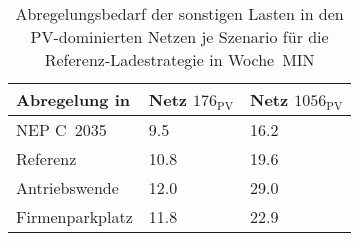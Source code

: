 {
\renewcommand{\arraystretch}{1.2}%
\begin{table}[H]
	\begin{center}
		\caption{Abregelungsbedarf der sonstigen Lasten in den PV-dominierten Netzen je Szenario für die Referenz-Ladestrategie in Woche~MIN}
		\begin{tabu} to 0.6\textwidth {X[1.5] X[1, r] X[1, r]}
			\toprule
			Abregelung in   \si{\mwh}    & Netz \(176_{\text{PV}}\) & Netz \(1056_{\text{PV}}\) \\ \midrule
			NEP C~\num{2035}             & \num{9.5}      & \num{16.2}      \\
			Referenz                     & \num{10.8}     & \num{19.6}      \\
			Antriebswende                & \num{12.0}     & \num{29.0}      \\
			\glqq Firmenparkplatz\grqq{} & \num{11.8}     & \num{22.9}      \\ \bottomrule
		\end{tabu}
		\label{tab:pv_dominated_week_a_load_cur}
	\end{center}
	\vspace{-3mm}%
\end{table}
}